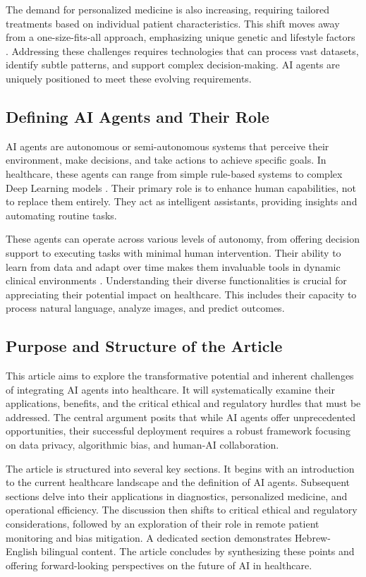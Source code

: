 \documentclass[12pt,a4paper]{article}
\begin{document}
The demand for personalized medicine is also increasing, requiring tailored treatments based on individual patient characteristics. This shift moves away from a one-size-fits-all approach, emphasizing unique genetic and lifestyle factors \cite{topol2019deep}. Addressing these challenges requires technologies that can process vast datasets, identify subtle patterns, and support complex decision-making. AI agents are uniquely positioned to meet these evolving requirements.

\subsection{Defining AI Agents and Their Role}
AI agents are autonomous or semi-autonomous systems that perceive their environment, make decisions, and take actions to achieve specific goals. In healthcare, these agents can range from simple rule-based systems to complex Deep Learning models \cite{russell2010artificial}. Their primary role is to enhance human capabilities, not to replace them entirely. They act as intelligent assistants, providing insights and automating routine tasks.

These agents can operate across various levels of autonomy, from offering decision support to executing tasks with minimal human intervention. Their ability to learn from data and adapt over time makes them invaluable tools in dynamic clinical environments \cite{lecun2015deep}. Understanding their diverse functionalities is crucial for appreciating their potential impact on healthcare. This includes their capacity to process natural language, analyze images, and predict outcomes.

\subsection{Purpose and Structure of the Article}
This article aims to explore the transformative potential and inherent challenges of integrating AI agents into healthcare. It will systematically examine their applications, benefits, and the critical ethical and regulatory hurdles that must be addressed. The central argument posits that while AI agents offer unprecedented opportunities, their successful deployment requires a robust framework focusing on data privacy, algorithmic bias, and human-AI collaboration.

The article is structured into several key sections. It begins with an introduction to the current healthcare landscape and the definition of AI agents. Subsequent sections delve into their applications in diagnostics, personalized medicine, and operational efficiency. The discussion then shifts to critical ethical and regulatory considerations, followed by an exploration of their role in remote patient monitoring and bias mitigation. A dedicated section demonstrates Hebrew-English bilingual content. The article concludes by synthesizing these points and offering forward-looking perspectives on the future of AI in healthcare.
\end{document}
